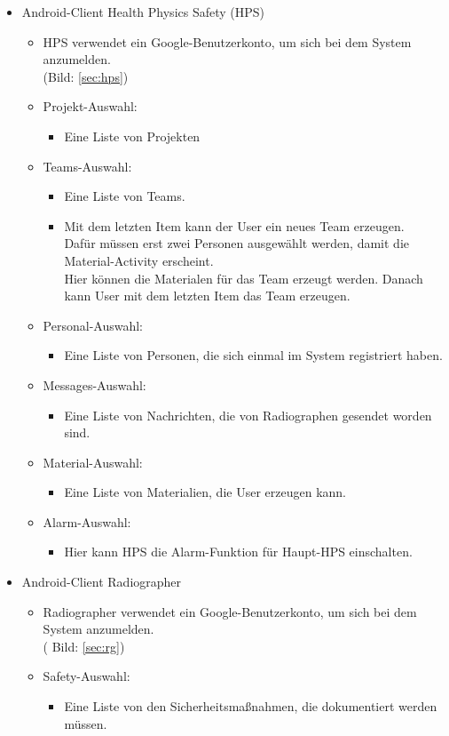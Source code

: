 \begin{itemize}
\item  Android-Client Health Physics Safety (HPS)
\begin{itemize}
\item HPS verwendet ein Google-Benutzerkonto, um sich bei dem System anzumelden.\\
(Bild: \ref{sec:hps}) 
\item Projekt-Auswahl: 
\begin{itemize}
\item Eine Liste von Projekten
\end{itemize}
\item Teams-Auswahl:
\begin{itemize}
\item Eine Liste von Teams.
\item Mit dem letzten Item kann der User ein neues Team erzeugen.\\
Dafür müssen erst zwei Personen ausgewählt werden, damit die Material-Activity erscheint.\\
Hier können die Materialen für das Team erzeugt werden.
Danach kann User mit dem letzten Item das Team erzeugen. 
\end{itemize}
\item Personal-Auswahl:
\begin{itemize}
\item Eine Liste von Personen, die sich einmal im System registriert haben.
\end{itemize}
\item Messages-Auswahl:
\begin{itemize}
\item Eine Liste von Nachrichten, die von Radiographen gesendet worden sind.
\end{itemize}
\item Material-Auswahl:
\begin{itemize}
\item Eine Liste von Materialien, die User erzeugen kann.
\end{itemize}
\item Alarm-Auswahl:
\begin{itemize}
\item Hier kann HPS die Alarm-Funktion für Haupt-HPS einschalten.
\end{itemize}
\end{itemize}
\item  Android-Client Radiographer
\begin{itemize}
\item Radiographer verwendet ein Google-Benutzerkonto, um sich bei dem System anzumelden.\\
( Bild: \ref{sec:rg})
\item Safety-Auswahl:
\begin{itemize}
\item Eine Liste von den Sicherheitsmaßnahmen, die dokumentiert werden müssen. 


\end{itemize}
\end{itemize}
\end{itemize}

